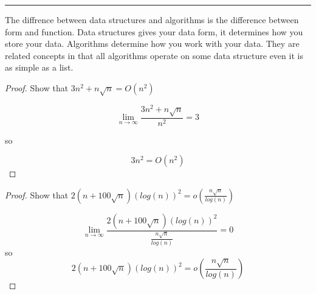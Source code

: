 \documentclass[11pt]{article}
\begin{document}
	\renewcommand{\headrulewidth}{0.4pt}
	
	
	
	\noindent
	\rule[0.1cm]{16.5cm}{0.01cm} 
	
	\vspace*{2mm}
	
	

	
	
	\bigskip
	\bigskip
	The diffrence between data structures and algorithms is the difference 
	between form and function. Data structures gives your data form, 
	it determines how you store your data. Algorithms determine how you work
	with your data. They are related concepts in that all algorithms operate
	on some data structure even it is as simple as a list. 
	\bigskip
	
	
	
	
	\begin{proof} 
		Show that $3n^2 + n\sqrt{n} = O(n^2)$
		
		$$\displaystyle \lim_{n \to \infty}\frac{ 3n^2 + n\sqrt{n}}{n^2} = 3$$
		
		\noindent 
		so
		
		 $$3n^2 = O(n^2)$$
	
	\end{proof}
	
	\bigskip
	
	
	\begin{proof}
		Show that $\displaystyle 2(n + 100\sqrt{n})(log(n))^2 = o(\frac{n\sqrt{n}}{log(n)})$
		
		
		$$\displaystyle \lim_{n \to \infty}\frac{2(n + 100\sqrt{n})(log(n))^2}{\frac{n\sqrt{n}}{log(n)}} = 0$$
		so
		$$\displaystyle 2(n + 100\sqrt{n})(log(n))^2 = o(\frac{n\sqrt{n}}{log(n)})$$
	\end{proof}
	
	
	
	\newpage
	
\end{document}
